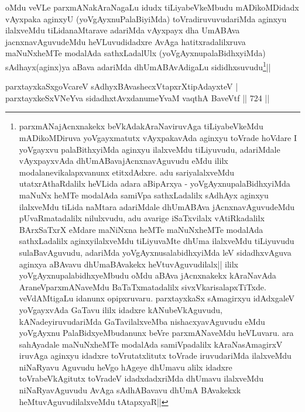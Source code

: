 \begin{artha}
oMdu veVLe parxmANakAraNagaLu idudx tiLiyabeVkeMbudu mADikoMDidadx vAyxpaka aginxyU (yoVgAyxnuPalaBiyiMda) toVradiruvuvudariMda aginxyu ilalxveMdu tiLidanaMtarave adariMda vAyxpayx dha UmABAva jacnxnavAguvudeMdu heVLuvudidadxre AvAga hatitxradalilxruva maNuNxheMTe modalAda sathxLadalUlx (yoVgAyxnupalaBidhxyiMda) sAdhayx(aginx)ya aBava adariMda dhUmABAvAdigaLu sididhxsuvudu\footnote{parxmANajAcnxnakekx beVkAdakAraNaviruvAga tiLiyabeVkeMdu mADikoMDiruva yoVgayxmatutx vAyxpakavAda aginxyu toVrade hoVdare I yoVgayxvu palaBithxyiMda aginxyu ilalxveMdu tiLiyuvudu, adariMdale vAyxpayxvAda dhUmABavajAcnxnavAguvudu eMdu ililx modalanevikalapxvanunx etitxdAdxre. adu sariyalalxveMdu utatxrAthaRdalilx heVLida adara aBipArxya - yoVgAyxnupalaBidhxyiMda maNuNx heMTe modalAda samiVpa sathxLadalilx sAdhAyx aginxyu ilalxveMdu tiLida naMtara adariMdale dhUmABAva jAcnxnavAguvudeMdu pUvaRmatadalilx nilulxvudu, adu avarige iSaTxvilalx vAtiRkadalilx BArxSaTxrX eMdare maNiNxna heMTe maNuNxheMTe modalAda sathxLadalilx aginxyilalxveMdu tiLiyuvaMte dhUma ilalxveMdu tiLiyuvudu sulaBavAguvudu, adariMda yoVgAyxnusalabidhxyiMda leV sidadhxvAguva aginxya aBAvavu dhUmaBAvakekx heVtuvAguvudilalx||
ililx yoVgAyxnupalabidhxyeMbudu oMdu aBAva jAcnxnakekx kAraNavAda AraneVparxmANaveMdu BaTaTxmatadalilx sivxVkarisalapxTiTxde. veVdAMtigaLu idanunx opipxruvaru. parxtayxkaSx sAmagirxyu idAdxgaleV yoVgayxvAda GaTavu ililx idadxre kANubeVkAguvudu, kANadeyiruvudariMda GaTavilalxveMba nishacxyavAguvudu eMdu yoVgAyxnu PalaBidxyeMbudanunx beVre parxmANaveMdu heVLuvaru. ara sahAyadale maNuNxheMTe modalAda samiVpadalilx kAraNasAmagirxV iruvAga aginxyu idadxre toVrutatxlitutx toVrade iruvudariMda ilalxveMdu niNaRyavu Aguvudu heVgo hAgeye dhUmavu alilx idadxre toVrabeVkAgitutx  toVradeV idadxdadxriMda dhUmavu  ilalxveMdu niNaRyavAguvudu AvAga sAdhABavavu dhUmA BAvakekxk heMtuvAguvudilalxveMdu tAtapxyaR||
}||
\end{artha}


\begin{shl}
parxtayxkaSxgoVcareV sAdhyxBAvashecxVtapxrXtipAdayxteV | \\
parxtayxkeSxVNeYva sidadhxtAvxdanumeYvaM vaqthA BaveVtf \hfill||  724 ||  
\end{shl}

